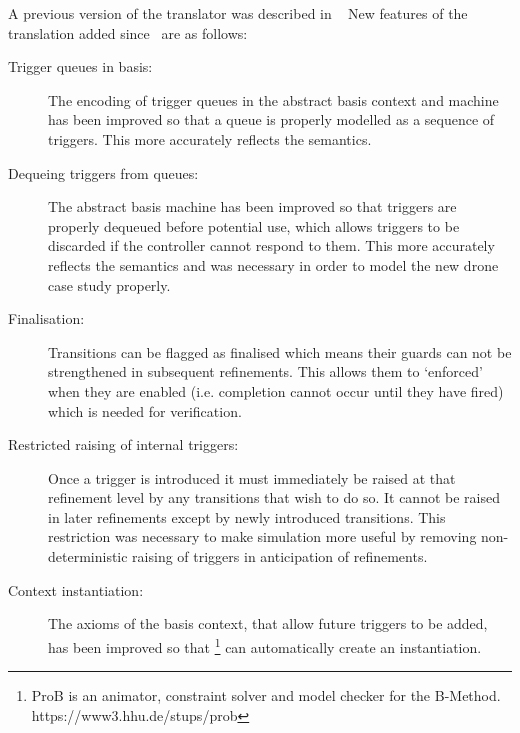 
 A previous version of the translator was described in ~\cite{MoSnHo18} New features of the translation added since~\cite{MoSnHo18} are as follows:
 \begin{description}
 \item[Trigger queues in basis:]
 	\begin{sloppypar}
 		The encoding of trigger queues in the abstract basis context and machine has been improved so that a queue is properly modelled as a sequence of triggers.
 		This more accurately reflects the \SCXML semantics.
 	\end{sloppypar}
 \item[Dequeing triggers from queues:]
   \begin{sloppypar}
     The abstract basis machine has been improved so that triggers are properly dequeued before potential use,
     which allows triggers to be discarded if the controller cannot respond to them. 
     This more accurately reflects the \SCXML semantics and was necessary in order to model the new drone case study properly.
   \end{sloppypar}

 \item[Finalisation:] Transitions can be flagged as finalised which means their guards can not be strengthened in subsequent refinements. This allows them to `enforced' when they are enabled (i.e. completion cannot occur until they have fired) which is needed for verification. 

 \item[Restricted raising of internal triggers:] Once a trigger is introduced it must immediately be raised at that refinement level by any transitions that wish to do so. It cannot be raised in later refinements except by newly introduced transitions. This restriction was necessary to make simulation more useful by removing non-deterministic raising of triggers in anticipation of refinements.

 \item[Context instantiation:] The axioms of the basis context, that allow future triggers to be added, has been improved so that \PROB\footnote{ProB is an animator, constraint solver and model checker for the B-Method. https://www3.hhu.de/stups/prob} can automatically create an instantiation. 

 \end{description}

